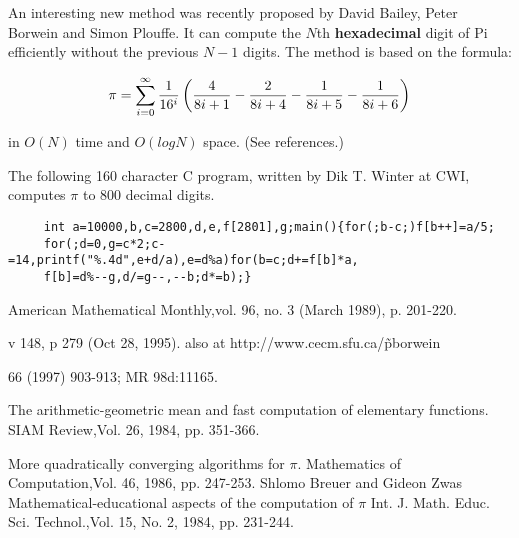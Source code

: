 %
An interesting new method was recently proposed by David Bailey, 
Peter Borwein and 
Simon Plouffe. It can compute the $N$th  {\bf hexadecimal} digit of Pi
efficiently without the previous $N-1$ digits. The method is based
on the formula:

\[ \pi = \sum_{i=0}^\infty {1 \over 16^i} \left(
    {4 \over 8i+1} - {2 \over 8i+4} - {1 \over 8i+5} - {1 \over 8i+6}
\right)
\]

in $O(N)$ time and $O(log N)$ space. (See references.)


     The
     following 160 character C program, written by Dik T. Winter at CWI,
     computes $\pi$ to 800 decimal digits.

     \begin{verbatim}
     int a=10000,b,c=2800,d,e,f[2801],g;main(){for(;b-c;)f[b++]=a/5;
     for(;d=0,g=c*2;c-=14,printf("%.4d",e+d/a),e=d%a)for(b=c;d+=f[b]*a,
     f[b]=d%--g,d/=g--,--b;d*=b);}
     \end{verbatim}



\Ref

     {American Mathematical
    Monthly,}{vol. 96, no. 3 (March 1989), p. 201-220.}

     {v 148, p 279 (Oct 28, 1995).
    also at http://www.cecm.sfu.ca/\~pborwein }

{ 66 (1997) 903-913; MR 98d:11165.}


    {The arithmetic-geometric mean and fast computation of elementary
    functions.}
    {SIAM Review,}{Vol. 26, 1984, pp. 351-366.}

    {More quadratically converging algorithms for $\pi$.}
    {Mathematics of Computation,}{Vol. 46, 1986, pp. 247-253.}
   \article
    {Shlomo Breuer and Gideon Zwas}
    {Mathematical-educational aspects of the computation of $\pi$}
    {Int. J. Math. Educ. Sci. Technol.,}{Vol. 15, No. 2, 1984,
    pp. 231-244.}

